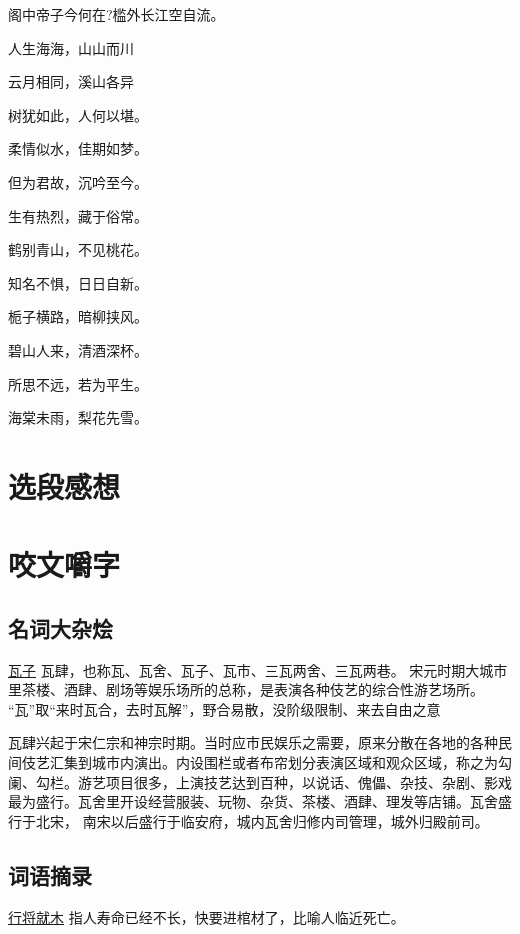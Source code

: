 \documentclass[UTF8,oneside]{ctexbook}
\begin{document}
\quad \quad 阁中帝子今何在?槛外长江空自流。

\mfApache \quad 人生海海，山山而川

\mfApache \quad 云月相同，溪山各异

\mfApache \quad 树犹如此，人何以堪。

\mfApache \quad 柔情似水，佳期如梦。

\mfApache \quad 但为君故，沉吟至今。

\mfApache \quad 生有热烈，藏于俗常。

\mfApache \quad 鹤别青山，不见桃花。

\mfApache \quad 知名不惧，日日自新。

\mfApache \quad 栀子横路，暗柳挟风。

\mfApache \quad 碧山人来，清酒深杯。

\mfApache \quad 所思不远，若为平生。

\mfApache \quad 海棠未雨，梨花先雪。

\mfApache \quad 
\chapter{选段感想}

\chapter{咬文嚼字}
\section{名词大杂烩}
\mfApache \quad \underline{瓦子} \quad 瓦肆，也称瓦、瓦舍、瓦子、瓦市、三瓦两舍、三瓦两巷。
宋元时期大城市里茶楼、酒肆、剧场等娱乐场所的总称，是表演各种伎艺的综合性游艺场所。
“瓦”取“来时瓦合，去时瓦解”，野合易散，没阶级限制、来去自由之意

瓦肆兴起于宋仁宗和神宗时期。当时应市民娱乐之需要，原来分散在各地的各种民间伎艺汇集到城市内演出。内设围栏或者布帘划分表演区域和观众区域，称之为勾阑、勾栏。游艺项目很多，上演技艺达到百种，以说话、傀儡、杂技、杂剧、影戏最为盛行。瓦舍里开设经营服装、玩物、杂货、茶楼、酒肆、理发等店铺。瓦舍盛行于北宋，
南宋以后盛行于临安府，城内瓦舍归修内司管理，城外归殿前司。

\section{词语摘录}
\mfApache \quad \underline{行将就木} \quad 指人寿命已经不长，快要进棺材了，比喻人临近死亡。
\end{document}
